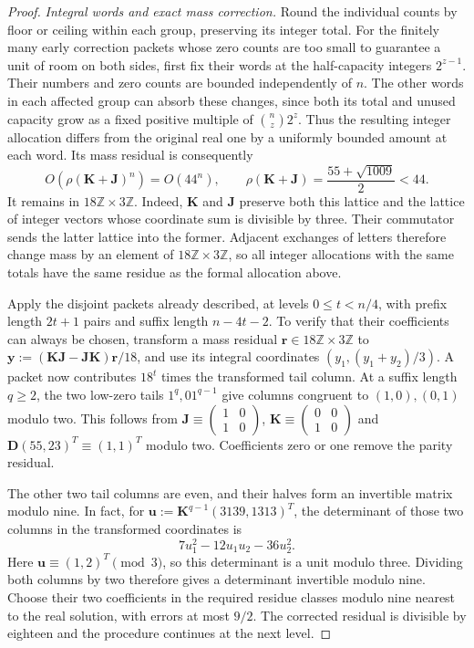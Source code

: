 \begin{proof}
\emph{Integral words and exact mass correction.}
Round the individual counts by floor or ceiling within each group, preserving its integer total. For the finitely many early correction packets whose zero counts are too small to guarantee a unit of room on both sides, first fix their words at the half-capacity integers $2^{z-1}$. Their numbers and zero counts are bounded independently of $n$. The other words in each affected group can absorb these changes, since both its total and unused capacity grow as a fixed positive multiple of $\binom nz2^z$. Thus the resulting integer allocation differs from the original real one by a uniformly bounded amount at each word. Its mass residual is consequently
\[
 O\!\left(\rho(\mathbf K+\mathbf J)^n\right)=O(44^n),
 \qquad \rho(\mathbf K+\mathbf J)=\frac{55+\sqrt{1009}}2<44.
\]
It remains in $18\mathbb Z\times3\mathbb Z$. Indeed, $\mathbf K$ and $\mathbf J$ preserve both this lattice and the lattice of integer vectors whose coordinate sum is divisible by three. Their commutator sends the latter lattice into the former. Adjacent exchanges of letters therefore change mass by an element of $18\mathbb Z\times3\mathbb Z$, so all integer allocations with the same totals have the same residue as the formal allocation above.

Apply the disjoint packets already described, at levels $0\le t<n/4$, with prefix length $2t+1$ pairs and suffix length $n-4t-2$. To verify that their coefficients can always be chosen, transform a mass residual $\mathbf r\in18\mathbb Z\times3\mathbb Z$ to
$\mathbf y:=(\mathbf K\mathbf J-\mathbf J\mathbf K)\mathbf r/18$,
and use its integral coordinates $(y_1,(y_1+y_2)/3)$. A packet now contributes $18^t$ times the transformed tail column. At a suffix length $q\ge2$, the two low-zero tails $1^q,01^{q-1}$ give columns congruent to $(1,0),(0,1)$ modulo two. This follows from
$\mathbf J\equiv\left(\begin{smallmatrix}1&0\\1&0\end{smallmatrix}\right)$,
$\mathbf K\equiv\left(\begin{smallmatrix}0&0\\1&0\end{smallmatrix}\right)$ and
$\mathbf D(55,23)^T\equiv(1,1)^T$ modulo two. Coefficients zero or one remove the parity residual.

The other two tail columns are even, and their halves form an invertible matrix modulo nine. In fact, for $\mathbf u:=\mathbf K^{q-1}(3139,1313)^T$, the determinant of those two columns in the transformed coordinates is
\[
 7u_1^2-12u_1u_2-36u_2^2.
\]
Here $\mathbf u\equiv(1,2)^T\pmod3$, so this determinant is a unit modulo three. Dividing both columns by two therefore gives a determinant invertible modulo nine. Choose their two coefficients in the required residue classes modulo nine nearest to the real solution, with errors at most $9/2$. The corrected residual is divisible by eighteen and the procedure continues at the next level.


\end{proof}
